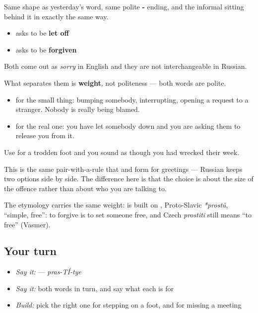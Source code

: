Same shape as yesterday's word, same polite \textbf{-} ending, and the informal \textbf{} sitting behind it in exactly the same way.

\begin{itemize}
\raggedright
  \item \textbf{} asks to be \textbf{let off}
  \item \textbf{} asks to be \textbf{forgiven}
\end{itemize}

Both come out as \emph{sorry} in English and they are not interchangeable in Russian.

\begin{culture}
What separates them is \textbf{weight}, not politeness — both words are polite.

\begin{itemize}
\raggedright
  \item \textbf{} for the small thing: bumping somebody, interrupting, opening a request to a stranger. Nobody is really being blamed.
  \item \textbf{} for the real one: you have let somebody down and you are asking them to release you from it.
\end{itemize}

Use \textbf{} for a trodden foot and you sound as though you had wrecked their week.

This is the same pair-with-a-rule that \textbf{} and \emph{} form for greetings — Russian keeps two options side by side. The difference here is that the choice is about the size of the offence rather than about who you are talking to.

The etymology carries the same weight: \textbf{} is built on \textbf{}, Proto-Slavic \emph{*prostŭ}, \textquotedblleft{}simple, free\textquotedblright{}: to forgive is to set someone free, and Czech \emph{prostiti} still means \textquotedblleft{}to free\textquotedblright{} (Vasmer).
\end{culture}

\subsection*{Your turn}
\begin{itemize}
\raggedright
  \item \emph{Say it:} \emph{} — \emph{pras-TÍ-tye}
  \item \emph{Say it:} both words in turn, and say what each is for
  \item \emph{Build:} pick the right one for stepping on a foot, and for missing a meeting
\end{itemize}

